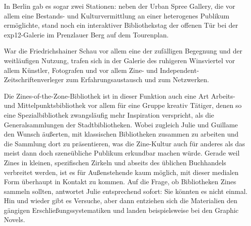 \documentclass[a4paper,
fontsize=11pt,
oneside,
numbers=noperiodatend,
parskip=half-,
bibliography=totoc,
final
]{scrartcl}
\begin{document}
In Berlin gab es sogar zwei Stationen: neben der Urban Spree Gallery,
die vor allem eine Bestands- und Kulturvermittlung an einer heterogenes
Publikum ermöglichte, stand noch ein interaktiver Bibliothekstag der
offenen Tür bei der exp12-Galerie im Prenzlauer Berg auf dem Tourenplan.

War die Friedrichshainer Schau vor allem eine der zufälligen Begegnung
und der weitläufigen Nutzung, trafen sich in der Galerie des ruhigeren
Winsviertel vor allem Künstler, Fotografen und vor allem Zine- und
Independent-Zeitschriftenverleger zum Erfahrungsaustausch und zum
Netzwerken.

Die Zines-of-the-Zone-Bibliothek ist in dieser Funktion auch eine Art
Arbeits- und Mittelpunktsbibliothek vor allem für eine Gruppe kreativ
Tätiger, denen so eine Spezialbibliothek zwangsläufig mehr Inspiration
verspricht, als die Generalsammlungen der Stadtbibliotheken. Wobei
zugleich Julie und Guillame den Wunsch äußerten, mit klassischen
Bibliotheken zusammen zu arbeiten und die Sammlung dort zu präsentieren,
was die Zine-Kultur auch für anderes als das meist dann doch
szeneübliche Publikum erkundbar machen würde. Gerade weil Zines in
kleinen, spezifischen Zirkeln und abseits des üblichen Buchhandels
verbreitet werden, ist es für Außenstehende kaum möglich, mit dieser
medialen Form überhaupt in Kontakt zu kommen. Auf die Frage, ob
Bibliotheken Zines sammeln sollten, antwortet Julie entsprechend sofort:
Sie könnten es nicht einmal. Hin und wieder gibt es Versuche, aber dann
entziehen sich die Materialien den gängigen Erschließungssystematiken
und landen beispielsweise bei den Graphic Novels.
\end{document}

